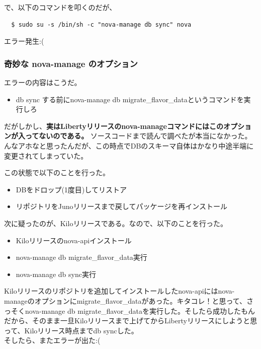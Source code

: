 \documentclass[9pt,b5paper,tombo,openany]{jsbook}
\begin{document}
\noindent
で、以下のコマンドを叩くのだが、

\begin{lstlisting}
  $ sudo su -s /bin/sh -c "nova-manage db sync" nova
\end{lstlisting}

\noindent
エラー発生:(

\subsubsection{奇妙な nova-manage のオプション}
\noindent
エラーの内容はこうだ。

\begin{itemize}
	\item db sync する前にnova-manage db migrate\_flavor\_dataというコマンドを実行しろ
\end{itemize}

だがしかし、\textbf{実はLibertyリリースのnova-manageコマンドにはこのオプションが入ってないのである。} ソースコードまで読んで調べたが本当になかった。んなアホなと思ったんだが、この時点でDBのスキーマ自体はかなり中途半端に変更されてしまっていた。

\noindent
この状態で以下のことを行った。

\begin{itemize}
	\item DBをドロップ(1度目)してリストア
	\item リポジトリをJunoリリースまで戻してパッケージを再インストール
\end{itemize}

\noindent
次に疑ったのが、Kiloリリースである。なので、以下のことを行った。

\begin{itemize}
	\item Kiloリリースのnova-apiインストール
	\item nova-manage db migrate\_flavor\_data実行
	\item nova-manage db sync実行
\end{itemize}

Kiloリリースのリポジトリを追加してインストールしたnova-apiにはnova-manageのオプションにmigrate\_flavor\_dataがあった。キタコレ！と思って、さっそくnova-manage db migrate\_flavor\_dataを実行した。そしたら成功したもんだから、そのまま一旦Kiloリリースまで上げてからLibertyリリースにしようと思って、Kiloリリース時点までdb syncした。\\[1ex]

\noindent
そしたら、またエラーが出た:(\\[1ex]
\end{document}

